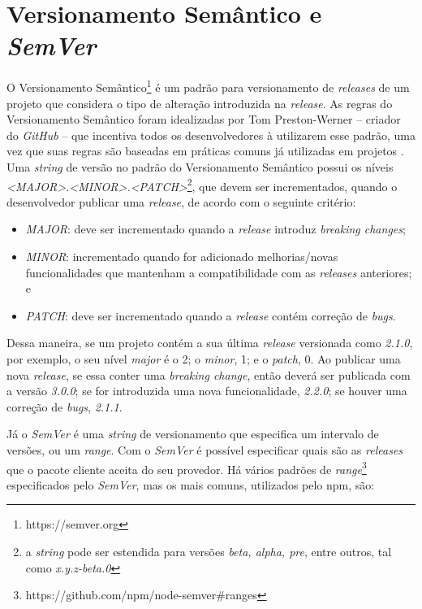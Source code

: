 \section{Versionamento Semântico e \textit{SemVer}}
\label{ref-teo:semver}
O Versionamento Semântico\footnote{https://semver.org} é um padrão para versionamento de \textit{releases} de um projeto que considera o tipo de alteração introduzida na \textit{release}. As regras do Versionamento Semântico foram idealizadas por Tom Preston-Werner -- criador do \textit{GitHub} -- que incentiva todos os desenvolvedores à utilizarem esse padrão, uma vez que suas regras são baseadas em práticas comuns já utilizadas em projetos \cite{teorical_reference:semver}. Uma \textit{string} de versão no padrão do Versionamento Semântico possui os níveis \textit{<MAJOR>.<MINOR>.<PATCH>}\footnote{a \textit{string} pode ser estendida para versões \textit{beta, alpha, pre}, entre outros, tal como \textit{x.y.z-beta.0}}, que devem ser incrementados, quando o desenvolvedor publicar uma \textit{release}, de acordo com o seguinte critério:

\begin{itemize}
    \item \textit{MAJOR}: deve ser incrementado quando a \textit{release} introduz \textit{breaking changes};
    \item \textit{MINOR}: incrementado quando for adicionado melhorias/novas funcionalidades que mantenham a compatibilidade com as \textit{releases} anteriores; e
    \item \textit{PATCH}: deve ser incrementado quando a \textit{release} contém correção de \textit{bugs}.
\end{itemize}{}

Dessa maneira, se um projeto contém a sua última \textit{release} versionada como \textit{2.1.0}, por exemplo, o seu nível \textit{major} é o 2; o \textit{minor}, 1; e o \textit{patch}, 0. Ao publicar uma nova \textit{release}, se essa conter uma \textit{breaking change}, então deverá ser publicada com a versão \textit{3.0.0}; se for introduzida uma nova funcionalidade, \textit{2.2.0}; se houver uma correção de \textit{bugs}, \textit{2.1.1}.

Já o \textit{SemVer} é uma \textit{string} de versionamento que especifica um intervalo de versões, ou um \textit{range}. Com o \textit{SemVer} é possível especificar quais são as \textit{releases} que o pacote cliente aceita do seu provedor. Há vários padrões de \textit{range}\footnote{https://github.com/npm/node-semver\#ranges} especificados pelo \textit{SemVer}, mas os mais comuns, utilizados pelo \gls{npm}, são:

